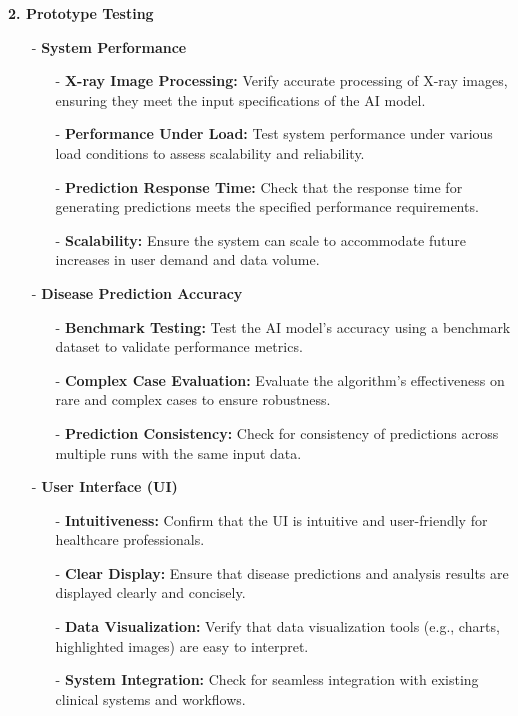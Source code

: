 \documentclass[12pt, titlepage]{article}
\begin{document}
\noindent \textbf{2. Prototype Testing}
\begin{itemize}
    \item[-] \textbf{System Performance}
    \begin{itemize}
        \item[-] \textbf{X-ray Image Processing:} Verify accurate processing of X-ray images, ensuring they meet the input specifications of the AI model.
        \item[-] \textbf{Performance Under Load:} Test system performance under various load conditions to assess scalability and reliability.
        \item[-] \textbf{Prediction Response Time:} Check that the response time for generating predictions meets the specified performance requirements.
        \item[-] \textbf{Scalability:} Ensure the system can scale to accommodate future increases in user demand and data volume.
    \end{itemize}

    \item[-] \textbf{Disease Prediction Accuracy}
    \begin{itemize}
        \item[-] \textbf{Benchmark Testing:} Test the AI model's accuracy using a benchmark dataset to validate performance metrics.
        \item[-] \textbf{Complex Case Evaluation:} Evaluate the algorithm's effectiveness on rare and complex cases to ensure robustness.
        \item[-] \textbf{Prediction Consistency:} Check for consistency of predictions across multiple runs with the same input data.
    \end{itemize}

    \item[-] \textbf{User Interface (UI)}
    \begin{itemize}
        \item[-] \textbf{Intuitiveness:} Confirm that the UI is intuitive and user-friendly for healthcare professionals.
        \item[-] \textbf{Clear Display:} Ensure that disease predictions and analysis results are displayed clearly and concisely.
        \item[-] \textbf{Data Visualization:} Verify that data visualization tools (e.g., charts, highlighted images) are easy to interpret.
        \item[-] \textbf{System Integration:} Check for seamless integration with existing clinical systems and workflows.
    \end{itemize}


\end{itemize}
\end{document}
